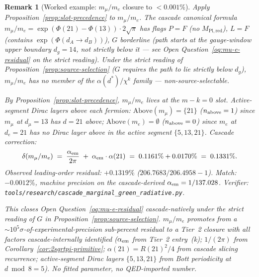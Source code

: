 \documentclass[12pt,a4paper]{article}
\newtheorem*{remark}{Remark}
\begin{document}
\begin{remark}[Worked example: $m_\mu/m_e$ closure to $<0.001\%$]\label{rem:slot-precedence-mu-e}
Apply Proposition~\ref{prop:slot-precedence} to $m_\mu/m_e$. The
cascade canonical formula
$m_\mu/m_e = \exp(\Phi(21)-\Phi(13))\cdot 2\sqrt{\pi}$ has flags
$P = F$ (no $M_{\mathrm{Pl,red}}$), $L = F$ (contains
$\exp(\Phi(d_A\to d_B))$), $G$ borderline (path starts at the
gauge-window upper boundary $d_g = 14$, not strictly below it ---
see Open Question~\ref{oq:mu-e-residual} on the strict reading).
Under the strict reading of Proposition~\ref{prop:source-selection}
($G$ requires the path to lie strictly below $d_g$),
$m_\mu/m_e$ has no member of the $\alpha(d^*)/\chi^k$ family ---
non-source-selectable.

By Proposition~\ref{prop:slot-precedence}, $m_\mu/m_e$ lives at
the $m-k = 0$ slot. Active-segment Dirac layers above each fermion:
$\mathrm{Above}(m_\mu) = \{21\}$ ($n_{\rm above} = 1$) since
$m_\mu$ at $d_\mu = 13$ has $d=21$ above; $\mathrm{Above}(m_e) = \emptyset$
($n_{\rm above} = 0$) since $m_e$ at $d_e = 21$ has no Dirac layer
above in the active segment $\{5, 13, 21\}$. Cascade correction:
\[
\delta(m_\mu/m_e) \;=\; \frac{\alpha_{\rm em}}{2\pi}
\;+\; \alpha_{\rm em}\cdot\alpha(21)
\;=\; 0.1161\% + 0.0170\% \;=\; 0.1331\%.
\]
Observed leading-order residual: $+0.1319\%$
($206.7683/206.4958 - 1$). Match: $-0.0012\%$, machine precision
on the cascade-derived $\alpha_{\rm em} = 1/137.028$. Verifier:
\texttt{tools/research/cascade\_marginal\_green\_radiative.py}.

This closes Open Question~\ref{oq:mu-e-residual} cascade-natively
under the strict reading of $G$ in Proposition~\ref{prop:source-selection}.
$m_\mu/m_e$ promotes from a $\sim 10^5\sigma$-of-experimental-precision
sub-percent residual to a Tier~2 closure with all factors
cascade-internally identified ($\alpha_{\rm em}$ from Tier~2 entry~(k);
$1/(2\pi)$ from Corollary~\ref{cor:2sqrtpi-primitive};
$\alpha(21) = R(21)^2/4$ from cascade slicing recurrence; active-segment
Dirac layers $\{5, 13, 21\}$ from Bott periodicity at $d \bmod 8 = 5$).
No fitted parameter, no QED-imported number.
\end{remark}
\end{document}
